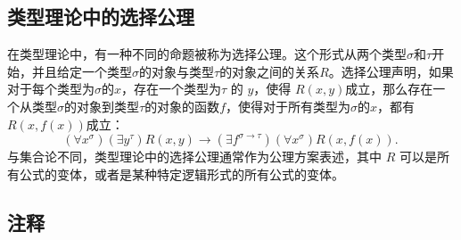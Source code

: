 \subsection{类型理论中的选择公理}  
在类型理论中，有一种不同的命题被称为选择公理。这个形式从两个类型\(\sigma\)和\(\tau\)开始，并且给定一个类型\(\sigma\)的对象与类型\(\tau\)的对象之间的关系\(R\)。选择公理声明，如果对于每个类型为\(\sigma\)的\(x\)，存在一个类型为\(\tau\) 的 \(y\)，使得 \(R(x,y)\)成立，那么存在一个从类型\(\sigma\)的对象到类型\(\tau\)的对象的函数\(f\)，使得对于所有类型为\(\sigma\)的\(x\)，都有\(R(x,f(x))\)成立：
\[
(\forall x^{\sigma})(\exists y^{\tau})R(x,y) \to (\exists f^{\sigma \to \tau})(\forall x^{\sigma})R(x,f(x)).~
\]
与集合论不同，类型理论中的选择公理通常作为公理方案表述，其中 \(R\) 可以是所有公式的变体，或者是某种特定逻辑形式的所有公式的变体。
\subsection{注释}  
